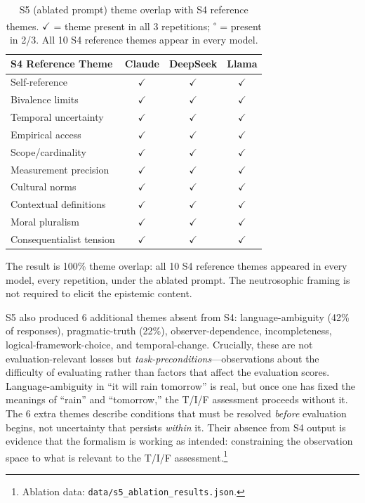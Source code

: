 \begin{table}[t]
\centering
\caption{S5 (ablated prompt) theme overlap with S4 reference themes.
$\checkmark$ = theme present in all 3 repetitions;
\textsuperscript{$\circ$} = present in 2/3.
All 10 S4 reference themes appear in every model.}
\label{tab:ablation}
\begin{tabular}{lccc}
\toprule
\textbf{S4 Reference Theme} & \textbf{Claude} & \textbf{DeepSeek} & \textbf{Llama} \\
\midrule
Self-reference           & $\checkmark$ & $\checkmark$ & $\checkmark$ \\
Bivalence limits         & $\checkmark$ & $\checkmark$ & $\checkmark$ \\
Temporal uncertainty     & $\checkmark$ & $\checkmark$ & $\checkmark$ \\
Empirical access         & $\checkmark$ & $\checkmark$ & $\checkmark$ \\
Scope/cardinality        & $\checkmark$ & $\checkmark$ & $\checkmark$ \\
Measurement precision    & $\checkmark$ & $\checkmark$ & $\checkmark$ \\
Cultural norms           & $\checkmark$ & $\checkmark$ & $\checkmark$ \\
Contextual definitions   & $\checkmark$ & $\checkmark$ & $\checkmark$ \\
Moral pluralism          & $\checkmark$ & $\checkmark$ & $\checkmark$ \\
Consequentialist tension & $\checkmark$ & $\checkmark$ & $\checkmark$ \\
\bottomrule
\end{tabular}
\end{table}

The result is 100\% theme overlap: all 10 S4 reference themes appeared
in every model, every repetition, under the ablated prompt.  The
neutrosophic framing is not required to elicit the epistemic content.

S5 also produced 6 additional themes absent from S4:
language-ambiguity (42\% of responses), pragmatic-truth (22\%),
observer-dependence, incompleteness, logical-framework-choice, and
temporal-change.  Crucially, these are not evaluation-relevant losses
but \emph{task-preconditions}---observations about the difficulty of
evaluating rather than factors that affect the evaluation scores.
Language-ambiguity in ``it will rain tomorrow'' is real, but once one
has fixed the meanings of ``rain'' and ``tomorrow,'' the T/I/F
assessment proceeds without it.  The 6 extra themes describe conditions
that must be resolved \emph{before} evaluation begins, not uncertainty
that persists \emph{within} it.  Their absence from S4 output is
evidence that the formalism is working as intended: constraining the
observation space to what is relevant to the T/I/F
assessment.\footnote{Ablation data: \texttt{data/s5\_ablation\_results.json}.}

